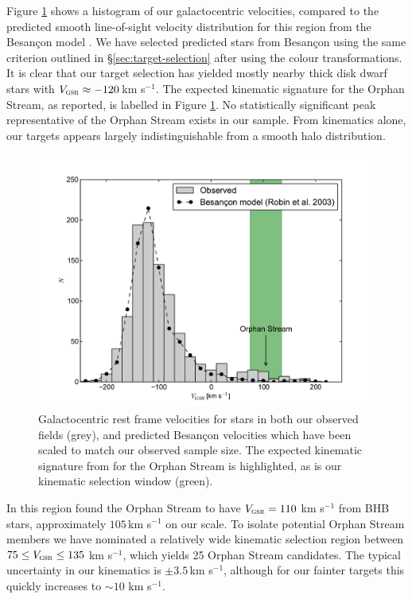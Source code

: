 \documentclass{emulateapj}
\begin{document}
Figure \ref{fig:velocities} shows a histogram of our galactocentric velocities, compared to the predicted smooth line-of-sight velocity distribution for this region from the Besan\c{c}on model \citep{Robin;et-al_2003}. We have selected predicted stars from Besan\c{c}on using the same criterion outlined in \S\ref{sec:target-selection} after using the \citet{Jordi;et-al_2006} colour transformations. It is clear that our target selection has yielded mostly nearby thick disk dwarf stars with $V_{\textsc{gsr}} \approx -120$\,km s$^{-1}$. The expected kinematic signature for the Orphan Stream, as \citet{Newberg;et-al_2010} reported, is labelled in Figure \ref{fig:velocities}. No statistically significant peak representative of the Orphan Stream exists in our sample. From kinematics alone, our targets appears largely indistinguishable from a smooth halo distribution.

\begin{figure}[h]
	\includegraphics[width=\columnwidth]{./figures/vgsr-histogram.pdf}
	\caption{Galactocentric rest frame velocities for stars in both our observed fields (grey), and predicted Besan\c{c}on velocities which have been scaled to match our observed sample size. The expected kinematic signature from \citet{Newberg;et-al_2010} for the Orphan Stream is highlighted, as is our kinematic selection window (green).}
	\label{fig:velocities}
\end{figure}

In this region \citet{Newberg;et-al_2010} found the Orphan Stream to have $V_{\textsc{gsr}} = 110$ km s$^{-1}$ from BHB stars, approximately $105$\,km s$^{-1}$ on our scale. To isolate potential Orphan Stream members we have nominated a relatively wide kinematic selection region between $75 \leq V_{\textsc{gsr}} \leq 135$ km s$^{-1}$, which yields 25 Orphan Stream candidates. The typical uncertainty in our kinematics is $\pm{}3.5$\,km s$^{-1}$, although for our fainter targets this quickly increases to $\sim10$ km s$^{-1}$.
\end{document}
